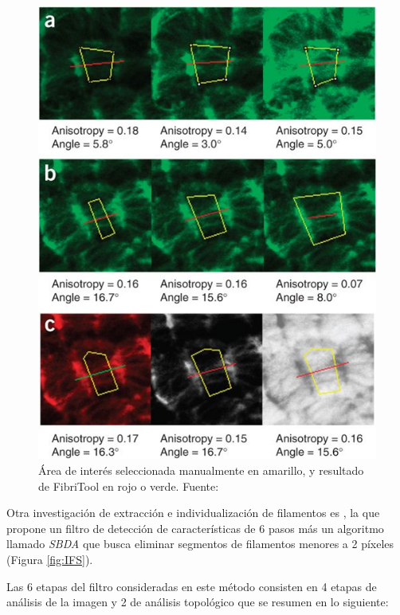 \begin{figure}[h!]
        \centering
        \includegraphics[scale=0.6]{imagenes/fibritool.jpg}
        \caption{\'Area de inter\'es seleccionada manualmente en amarillo, y resultado de FibriTool en rojo o verde. Fuente: \cite{boudaoud2014fibriltool}}
        \label{fig:fibritool}
\end{figure}

Otra investigaci\'on de extracci\'on e individualizaci\'on de filamentos es \cite{qiu2014quantitative}, la que propone un filtro de detecci\'on de caracter\'isticas de 6 pasos m\'as un algoritmo llamado \textit{SBDA} que busca eliminar segmentos de filamentos menores a 2 p\'ixeles (Figura \ref{fig:IFS}). 

Las 6 etapas del filtro consideradas en este m\'etodo consisten en 4 etapas de an\'alisis de la imagen y 2 de an\'alisis topol\'ogico que se resumen en lo siguiente:

